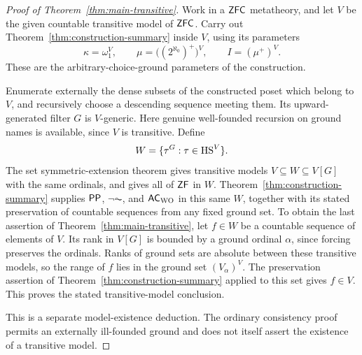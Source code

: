 \begin{proof}[Proof of Theorem~\ref{thm:main-transitive}]
Work in a $\mathsf{ZFC}$ metatheory, and let $V$ be the given
countable transitive model of $\mathsf{ZFC}$. Carry out
Theorem~\ref{thm:construction-summary} inside $V$, using its
parameters
\[
 \kappa=\omega_1^V,\qquad
 \mu=\bigl((2^{\aleph_0})^+\bigr)^V,\qquad
 I=(\mu^+)^V.
\]
These are the arbitrary-choice-ground parameters of the
construction.

Enumerate externally the dense subsets of the constructed poset
which belong to $V$, and recursively choose a descending
sequence meeting them. Its upward-generated filter $G$ is
$V$-generic. Here genuine well-founded recursion on ground names
is available, since $V$ is transitive. Define
\[
 W=\{\tau^G:\tau\in\mathrm{HS}^V\}.
\]
The set symmetric-extension theorem gives transitive models
$V\subseteq W\subseteq V[G]$ with the same ordinals, and gives
all of $\mathsf{ZF}$ in $W$.
Theorem~\ref{thm:construction-summary} supplies
$\mathsf{PP}$, $\neg\AC$, and $\mathsf{AC}_{\mathrm{WO}}$ in this same $W$, together
with its stated preservation of countable sequences from any fixed
ground set. To obtain the last assertion of
Theorem~\ref{thm:main-transitive}, let $f\in W$ be a countable
sequence of elements of $V$. Its rank in $V[G]$ is bounded by a
ground ordinal $\alpha$, since forcing preserves the ordinals.
Ranks of ground sets are absolute between these transitive models,
so the range of $f$ lies in the ground set $(V_\alpha)^V$.
The preservation assertion of Theorem~\ref{thm:construction-summary}
applied to this set gives $f\in V$. This proves the stated
transitive-model conclusion.

This is a separate model-existence deduction. The ordinary
consistency proof permits an externally ill-founded ground and
does not itself assert the existence of a transitive model.
\end{proof}

